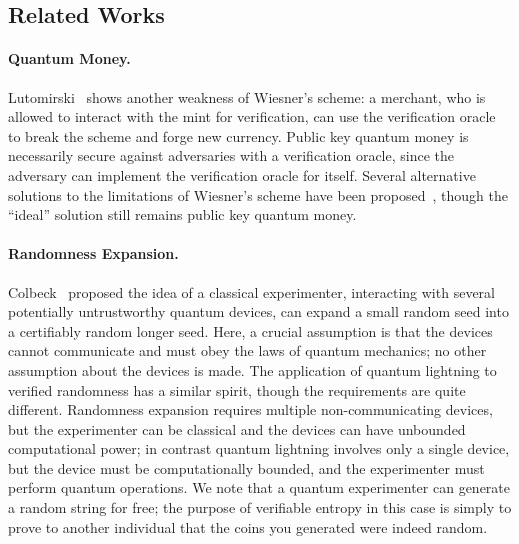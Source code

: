 \subsection{Related Works}

\paragraph{Quantum Money.} Lutomirski~\cite{Lutomirski10} shows another weakness of Wiesner's scheme: a merchant, who is allowed to interact with the mint for verification, can use the verification oracle to break the scheme and forge new currency. Public key quantum money is necessarily secure against adversaries with a verification oracle, since the adversary can implement the verification oracle for itself.  Several alternative solutions to the limitations of Wiesner's scheme have been proposed~\cite{MosSte10,Gavinsky11}, though the ``ideal'' solution still remains public key quantum money.

\paragraph{Randomness Expansion.}  Colbeck~\cite{Colbeck09} proposed the idea of a classical experimenter, interacting with several potentially untrustworthy quantum devices, can expand a small random seed into a certifiably random longer seed.  Here, a crucial assumption is that the devices cannot communicate and must obey the laws of quantum mechanics; no other assumption about the devices is made.  The application of quantum lightning to verified randomness has a similar spirit, though the requirements are quite different.  Randomness expansion requires multiple non-communicating devices, but the experimenter can be classical and the devices can have unbounded computational power; in contrast quantum lightning involves only a single device, but the device must be computationally bounded, and the experimenter must perform quantum operations.  We note that a quantum experimenter can generate a random string for free; the purpose of verifiable entropy in this case is simply to prove to another individual that the coins you generated were indeed random.


